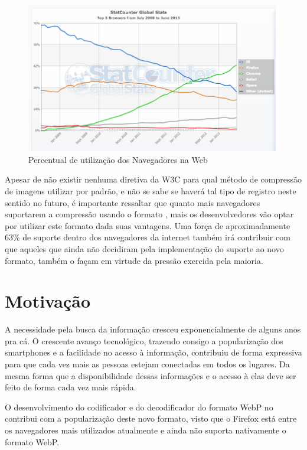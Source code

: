 \documentclass[espaco=simples,appendix=Name]{abnt}
\begin{document}
\begin{figure}[h]
  \centering
    \includegraphics[scale=0.5]{BrowserCounter_2013.png}
  \caption{Percentual de utilização dos Navegadores na Web \cite{BrowserStats}}
\end{figure}

Apesar de não existir nenhuma diretiva da W3C para qual método de compressão de imagens utilizar por padrão, e não se sabe se haverá tal tipo de registro neste sentido no futuro, é importante ressaltar que quanto mais navegadores suportarem a compressão usando o formato , mais os desenvolvedores vão optar por utilizar este formato dada suas vantagens. Uma força de aproximadamente 63\% de suporte dentro dos navegadores da internet também irá contribuir com que aqueles que ainda não decidiram pela implementação do suporte ao novo formato, também o façam em virtude da pressão exercida pela maioria.

\section{Motivação}

A necessidade pela busca da informação cresceu exponencialmente de alguns anos pra cá. O crescente avanço tecnológico, trazendo consigo a popularização dos smartphones e a facilidade no acesso à informação, contribuiu de forma expressiva para que cada vez mais as pessoas estejam conectadas em todos os lugares. Da mesma forma que a disponibilidade dessas informações e o acesso à elas deve ser feito de forma cada vez mais rápida.

O desenvolvimento do codificador e do decodificador do formato WebP no  contribui com a popularização deste novo formato, visto que o Firefox está entre os navegadores mais utilizados atualmente e ainda não suporta nativamente o formato WebP.
\end{document}
